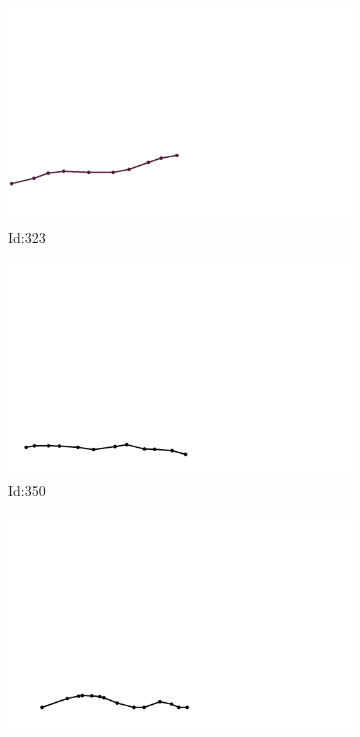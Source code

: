 \documentclass[12pt,twoside]{report}
\begin{document}
\begin{figure}
\centering
\begin{subfigure}[b]{0.20\textwidth}
\centering
\includegraphics[width=\textwidth]{../../trajectories/323.png}
\caption{Id:323}
\end{subfigure}
\begin{subfigure}[b]{0.20\textwidth}
\centering
\includegraphics[width=\textwidth]{../../trajectories/350.png}
\caption{Id:350}
\end{subfigure}
\begin{subfigure}[b]{0.20\textwidth}
\centering
\includegraphics[width=\textwidth]{../../trajectories/507.png}

\end{subfigure}
\end{figure}
\end{document}
